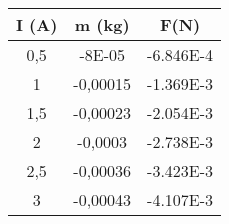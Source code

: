 \begin{tabular}{| c | c | c |}
\hline
I (A)	&m (kg) & F(N)\\ \hline
0,5	&-8E-05 & -6.846E-4\\
1	&-0,00015 & -1.369E-3\\
1,5	&-0,00023 & -2.054E-3\\
2	&-0,0003 & -2.738E-3\\
2,5	&-0,00036 & -3.423E-3\\
3	&-0,00043 & -4.107E-3\\ \hline
\end{tabular}
